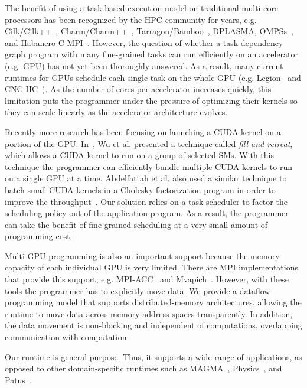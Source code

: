 The benefit of using a task-based execution model on traditional multi-core processors has been recognized by the HPC community for years, e.g. Cilk/Cilk++~\cite{cilk,BlumofeJoKu95}, Charm/Charm++~\cite{charm++}, Tarragon/Bamboo~\cite{cicotti11:dissertation,bamboo, bamboo-LU, bambooThesis}, DPLASMA\cite{dplasma,Bosilca:2012:DAGuE}, OMPSs~\cite{ompss,nexus}, and Habanero-C MPI~\cite{Chatterjee:2013:HCMPI}.
However, the question of whether a task dependency graph program with many fine-grained tasks can run efficiently on an accelerator (e.g. GPU) has not yet been thoroughly answered.
As a result, many current runtimes for GPUs schedule each single task on the whole GPU (e.g. Legion~\cite{legion} and CNC-HC~\cite{cnc-hc}).
As the number of cores per accelerator increases quickly, this limitation puts the programmer under the pressure of optimizing their kernels so they can scale linearly as the accelerator architecture evolves.

Recently more research has been focusing on launching a CUDA kernel on a portion of the GPU.
In~\cite{fillNRetreat}, Wu et al. presented a technique called {\em fill and retreat}, which allows a CUDA kernel to run on a group of selected SMs.
With this technique the programmer can efficiently bundle multiple CUDA kernels to run on a single GPU at a time.
Abdelfattah et al. also used a similar technique to batch small CUDA kernels in a Cholesky factorization program in order to improve the throughput~\cite{batchedCholesky}.
Our solution relies on a task scheduler to factor the scheduling policy out of the application program.
As a result, the programmer can take the benefit of fine-grained scheduling at a very small amount of programming cost.

Multi-GPU programming is also an important support because the memory capacity of each individual GPU is very limited.
There are MPI implementations that provide this support, e.g. MPI-ACC~\cite{mpiacc, mpiacc1} and Mvapich~\cite{mvapich2gpu}.
However, with these tools the programmer has to explicitly move data.
We provide a dataflow programming model that supports distributed-memory architectures, allowing the runtime to move data across memory address spaces transparently.
In addition, the data movement is non-blocking and independent of computations, overlapping communication with computation.

Our runtime is general-purpose.
Thus, it supports a wide range of applications, as opposed to other domain-specific runtimes such as MAGMA~\cite{MAGMA}, Physics~\cite{physics}, and Patus~\cite{patus}.
